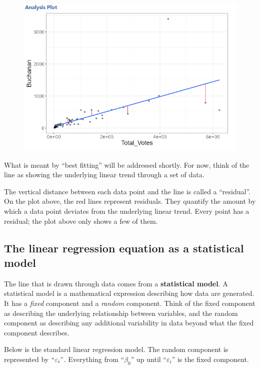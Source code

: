 \documentclass[
  letterpaper,
  DIV=11,
  numbers=noendperiod]{scrreprt}
\begin{document}
\begin{figure}

{\centering \includegraphics{images/mod2_pt1 (1).png}

}

\end{figure}

What is meant by ``best fitting'' will be addressed shortly. For now,
think of the line as showing the underlying linear trend through a set
of data.

The vertical distance between each data point and the line is called a
``residual''. On the plot above, the red lines represent residuals. They
quantify the amount by which a data point deviates from the underlying
linear trend. Every point has a residual; the plot above only shows a
few of them.

\hypertarget{the-linear-regression-equation-as-a-statistical-model}{%
\subsection{The linear regression equation as a statistical
model}\label{the-linear-regression-equation-as-a-statistical-model}}

The line that is drawn through data comes from a \textbf{statistical
model}. A statistical model is a mathematical expression describing how
data are generated. It has a \emph{fixed} component and a \emph{random}
component. Think of the fixed component as describing the underlying
relationship between variables, and the random component as describing
any additional variability in data beyond what the fixed component
describes.

Below is the standard linear regression model. The random component is
represented by \(``\varepsilon_i"\). Everything from ``\(\beta_0\)'' up
until ``\(\varepsilon_i\)'' is the fixed component.
\end{document}
